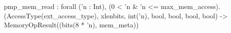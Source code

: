 pmp_mem_read : forall ('n : Int), (0 < 'n & 'n <= max_mem_access).
  (AccessType(ext_access_type), xlenbits, int('n), bool, bool, bool, bool) -> MemoryOpResult((bits(8 * 'n), mem_meta))